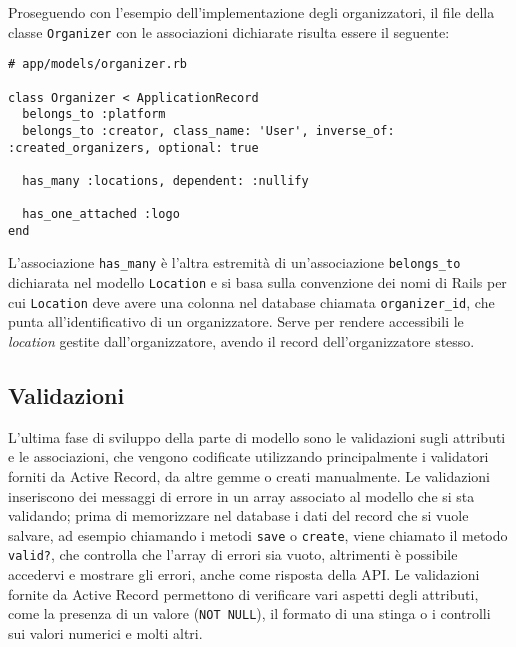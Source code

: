 Proseguendo con l'esempio dell'implementazione degli organizzatori, il file della classe \verb|Organizer| con le associazioni dichiarate risulta essere il seguente:
\begin{verbatim}
# app/models/organizer.rb

class Organizer < ApplicationRecord
  belongs_to :platform
  belongs_to :creator, class_name: 'User', inverse_of: :created_organizers, optional: true

  has_many :locations, dependent: :nullify

  has_one_attached :logo
end
\end{verbatim}
L'associazione \verb|has_many| è l'altra estremità di un'associazione \verb|belongs_to| dichiarata nel modello \verb|Location| e si basa sulla convenzione dei nomi di Rails per cui \verb|Location| deve avere una colonna nel database chiamata \verb|organizer_id|, che punta all'identificativo di un organizzatore. Serve per rendere accessibili le \emph{location} gestite dall'organizzatore, avendo il record dell'organizzatore stesso.

\subsection{Validazioni} \label{code:validates}
L'ultima fase di sviluppo della parte di modello sono le validazioni sugli attributi e le associazioni, che vengono codificate utilizzando principalmente i validatori forniti da Active Record, da altre gemme o creati manualmente. Le validazioni inseriscono dei messaggi di errore in un array associato al modello che si sta validando; prima di memorizzare nel database i dati del record che si vuole salvare, ad esempio chiamando i metodi \verb|save| o \verb|create|, viene chiamato il metodo \verb|valid?|, che controlla che l'array di errori sia vuoto, altrimenti è possibile accedervi e mostrare gli errori, anche come risposta della API. Le validazioni fornite da Active Record permettono di verificare vari aspetti degli attributi, come la presenza di un valore (\verb|NOT NULL|), il formato di una stinga o i controlli sui valori numerici e molti altri.

